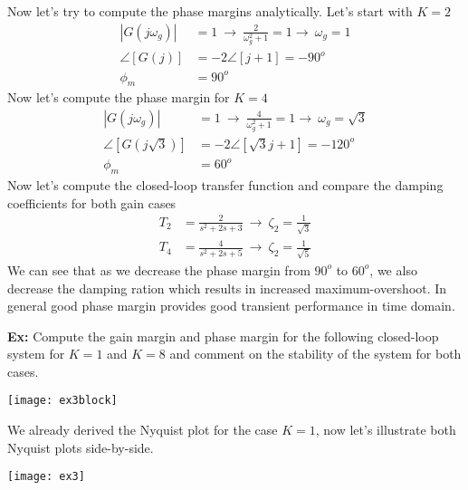\documentclass[twoside]{article}
\begin{document}
Now let's try to compute the phase margins analytically.
Let's start with $K = 2$
%
\begin{align*}
  | G(j \omega_g) | &= 1 \ \rightarrow \  
                      \frac{2}{ \omega_g^2 + 1 }  = 1
  \rightarrow \ \omega_g = 1 
  \\
  \angle [ G(j) ] &= - 2 \angle [ j + 1 ] = -90^o 
  \\
 \phi_m &= 90^o  
\end{align*}
%
Now let's compute the phase margin for $K = 4$
%
\begin{align*}
  | G(j \omega_g) | &= 1 \ \rightarrow \  
                      \frac{4}{ \omega_g^2 + 1 }  = 1
  \rightarrow \ \omega_g = \sqrt{3}
  \\
  \angle [ G(j \sqrt{3}) ] &= - 2 \angle [ \sqrt{3} j + 1 ] = -120^o 
  \\
 \phi_m &= 60^o  
\end{align*}
%
Now let's compute the closed-loop transfer function
and compare the damping coefficients for both gain cases
%
\begin{align*}
  T_2 &= \frac{2}{s^2 + 2 s + 3} \ \rightarrow \ \zeta_2 = \frac{1}{\sqrt{3}}
        \\
  T_4 &= \frac{4}{s^2 + 2 s + 5} \ \rightarrow \ \zeta_2 = \frac{1}{\sqrt{5}}
\end{align*}
%
We can see that as we decrease the phase margin from $90^o$ to $60^o$,
we also decrease the damping ration which results in increased maximum-overshoot.
In general good phase margin provides good transient performance in time domain. 

\vspace{6pt}

\textbf{Ex:} Compute the gain margin and phase margin 
for the following closed-loop system for $K = 1$ and $K = 8$
and comment on the stability of the system for both cases. 

\begin{center}
\begin{minipage}[h]{\linewidth}
    \begin{center}
      \texttt{[image: ex3block]}
    \end{center}
\end{minipage}
\end{center}

We already derived the Nyquist plot for the case $K = 1$,
now let's illustrate both Nyquist plots side-by-side.

\begin{center}
\begin{minipage}[h]{\linewidth}
    \begin{center}
      \texttt{[image: ex3]}
    \end{center}
\end{minipage}
\end{center}
\end{document}
